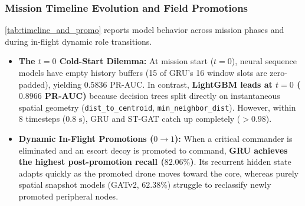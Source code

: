 \documentclass[9pt]{ieeeconf}
\begin{document}
\subsubsection{Mission Timeline Evolution and Field Promotions}
\cref{tab:timeline_and_promo} reports model behavior across mission phases and during in-flight dynamic role transitions.

\begin{table}[h]
\centering
\caption{Timeline Progression and Field Promotion Tracking}
\label{tab:timeline_and_promo}
\scriptsize
{}
\end{table}

\begin{itemize}
    \item \textbf{The $t=0$ Cold-Start Dilemma:} At mission start ($t=0$), neural sequence models have empty history buffers (15 of GRU's 16 window slots are zero-padded), yielding $0.5836$ PR-AUC. In contrast, \textbf{LightGBM leads at $t=0$ ($0.8966$ PR-AUC)} because decision trees split directly on instantaneous spatial geometry (\texttt{dist\_to\_centroid}, \texttt{min\_neighbor\_dist}). However, within 8 timesteps ($0.8\text{ s}$), GRU and ST-GAT catch up completely ($>0.98$).
    \item \textbf{Dynamic In-Flight Promotions ($0 \to 1$):} When a critical commander is eliminated and an escort decoy is promoted to command, \textbf{GRU achieves the highest post-promotion recall ($82.06\%$)}. Its recurrent hidden state adapts quickly as the promoted drone moves toward the core, whereas purely spatial snapshot models (GATv2, $62.38\%$) struggle to reclassify newly promoted peripheral nodes.
\end{itemize}
\end{document}
